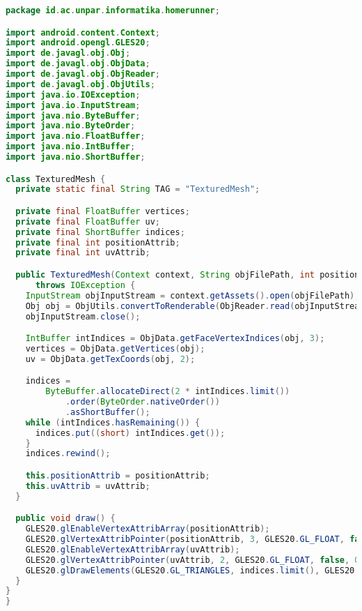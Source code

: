 \begin{lstlisting}[language=Java,caption=TexturedMesh.java]
package id.ac.unpar.informatika.homerunner;

import android.content.Context;
import android.opengl.GLES20;
import de.javagl.obj.Obj;
import de.javagl.obj.ObjData;
import de.javagl.obj.ObjReader;
import de.javagl.obj.ObjUtils;
import java.io.IOException;
import java.io.InputStream;
import java.nio.ByteBuffer;
import java.nio.ByteOrder;
import java.nio.FloatBuffer;
import java.nio.IntBuffer;
import java.nio.ShortBuffer;

class TexturedMesh {
  private static final String TAG = "TexturedMesh";

  private final FloatBuffer vertices;
  private final FloatBuffer uv;
  private final ShortBuffer indices;
  private final int positionAttrib;
  private final int uvAttrib;

  public TexturedMesh(Context context, String objFilePath, int positionAttrib, int uvAttrib)
      throws IOException {
    InputStream objInputStream = context.getAssets().open(objFilePath);
    Obj obj = ObjUtils.convertToRenderable(ObjReader.read(objInputStream));
    objInputStream.close();

    IntBuffer intIndices = ObjData.getFaceVertexIndices(obj, 3);
    vertices = ObjData.getVertices(obj);
    uv = ObjData.getTexCoords(obj, 2);

    indices =
        ByteBuffer.allocateDirect(2 * intIndices.limit())
            .order(ByteOrder.nativeOrder())
            .asShortBuffer();
    while (intIndices.hasRemaining()) {
      indices.put((short) intIndices.get());
    }
    indices.rewind();

    this.positionAttrib = positionAttrib;
    this.uvAttrib = uvAttrib;
  }

  public void draw() {
    GLES20.glEnableVertexAttribArray(positionAttrib);
    GLES20.glVertexAttribPointer(positionAttrib, 3, GLES20.GL_FLOAT, false, 0, vertices);
    GLES20.glEnableVertexAttribArray(uvAttrib);
    GLES20.glVertexAttribPointer(uvAttrib, 2, GLES20.GL_FLOAT, false, 0, uv);
    GLES20.glDrawElements(GLES20.GL_TRIANGLES, indices.limit(), GLES20.GL_UNSIGNED_SHORT, indices);
  }
}
}
\end{lstlisting}

